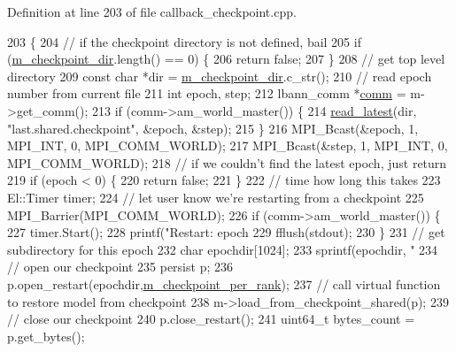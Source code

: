 Definition at line 203 of file callback\+\_\+checkpoint.\+cpp.


\begin{DoxyCode}
203                                                       \{
204   \textcolor{comment}{// if the checkpoint directory is not defined, bail}
205   \textcolor{keywordflow}{if} (\hyperlink{classlbann_1_1lbann__callback__checkpoint_ac89386fda60744e6399f97003fea3711}{m\_checkpoint\_dir}.length() == 0) \{
206     \textcolor{keywordflow}{return} \textcolor{keyword}{false};
207   \}
208   \textcolor{comment}{// get top level directory}
209   \textcolor{keyword}{const} \textcolor{keywordtype}{char} *dir = \hyperlink{classlbann_1_1lbann__callback__checkpoint_ac89386fda60744e6399f97003fea3711}{m\_checkpoint\_dir}.c\_str();
210   \textcolor{comment}{// read epoch number from current file}
211   \textcolor{keywordtype}{int} epoch, step;
212   lbann\_comm *\hyperlink{file__io_8cpp_ab048c6f9fcbcfaa57ce68b00263dbebe}{comm} = m->get\_comm();
213   \textcolor{keywordflow}{if} (comm->am\_world\_master()) \{
214     \hyperlink{namespacelbann_abebab8298e56db6a455a9ed08ab42bb4}{read\_latest}(dir, \textcolor{stringliteral}{"last.shared.checkpoint"}, &epoch, &step);
215   \}
216   MPI\_Bcast(&epoch, 1, MPI\_INT, 0, MPI\_COMM\_WORLD);
217   MPI\_Bcast(&step,  1, MPI\_INT, 0, MPI\_COMM\_WORLD);
218   \textcolor{comment}{// if we couldn't find the latest epoch, just return}
219   \textcolor{keywordflow}{if} (epoch < 0) \{
220     \textcolor{keywordflow}{return} \textcolor{keyword}{false};
221   \}
222   \textcolor{comment}{// time how long this takes}
223   El::Timer timer;
224   \textcolor{comment}{// let user know we're restarting from a checkpoint}
225   MPI\_Barrier(MPI\_COMM\_WORLD);
226   \textcolor{keywordflow}{if} (comm->am\_world\_master()) \{
227     timer.Start();
228     printf(\textcolor{stringliteral}{"Restart: epoch %
229     fflush(stdout);
230   \}
231   \textcolor{comment}{// get subdirectory for this epoch}
232   \textcolor{keywordtype}{char} epochdir[1024];
233   sprintf(epochdir, \textcolor{stringliteral}{"%
234   \textcolor{comment}{// open our checkpoint}
235   persist p;
236   p.open\_restart(epochdir,\hyperlink{classlbann_1_1lbann__callback__checkpoint_a36af7331ddf213339fe7282cb53ffedc}{m\_checkpoint\_per\_rank});
237   \textcolor{comment}{// call virtual function to restore model from checkpoint}
238   m->load\_from\_checkpoint\_shared(p);
239   \textcolor{comment}{// close our checkpoint}
240   p.close\_restart();
241   uint64\_t bytes\_count = p.get\_bytes();
}}
\end{DoxyCode}
